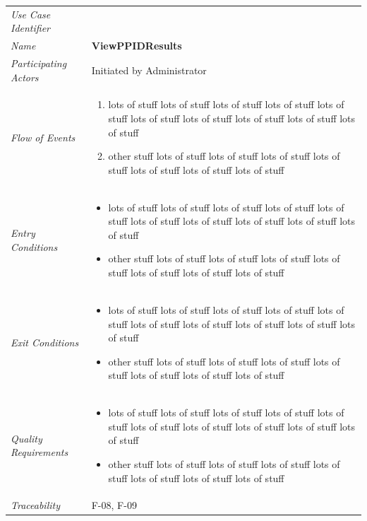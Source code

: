 \documentclass[12pt,letterpaper]{article}
\begin{document}
\begin{center}
	\begin{tabu} to 
		\toprule
		Use Case Identifier & \viewppidresults{} \\
		Name & {\bf ViewPPIDResults} \\
		Participating Actors & Initiated by Administrator \\
		Flow of Events & 
	    \begin{enumerate}[topsep=-1em]
		    \item lots of stuff lots of stuff lots of stuff lots of stuff lots of stuff lots of stuff lots of stuff lots of stuff lots of stuff lots of stuff
		    \item other stuff lots of stuff lots of stuff lots of stuff lots of stuff lots of stuff lots of stuff lots of stuff
		\end{enumerate} \\

		Entry Conditions &
		\begin{itemize}[topsep=-1em]
		    \item lots of stuff lots of stuff lots of stuff lots of stuff lots of stuff lots of stuff lots of stuff lots of stuff lots of stuff lots of stuff
		    \item other stuff lots of stuff lots of stuff lots of stuff lots of stuff lots of stuff lots of stuff lots of stuff
        \end{itemize} \\

		Exit Conditions &
		\begin{itemize}[topsep=-1em]
		    \item lots of stuff lots of stuff lots of stuff lots of stuff lots of stuff lots of stuff lots of stuff lots of stuff lots of stuff lots of stuff
		    \item other stuff lots of stuff lots of stuff lots of stuff lots of stuff lots of stuff lots of stuff lots of stuff
        \end{itemize} \\

		Quality Requirements &
		\begin{itemize}[topsep=-1em]
		    \item lots of stuff lots of stuff lots of stuff lots of stuff lots of stuff lots of stuff lots of stuff lots of stuff lots of stuff lots of stuff
		    \item other stuff lots of stuff lots of stuff lots of stuff lots of stuff lots of stuff lots of stuff lots of stuff
        \end{itemize} \\

		Traceability & F-08, F-09 \\
		\toprule
	\end{tabu}
\end{center}
\end{document}
